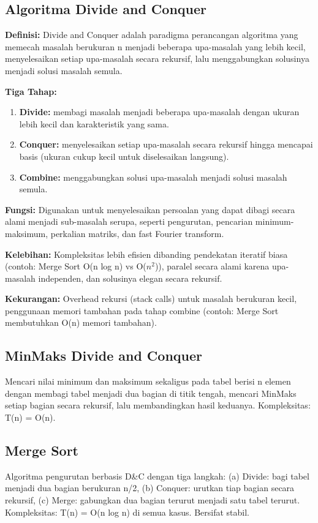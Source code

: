\subsection{Algoritma Divide and Conquer}
\textbf{Definisi:} Divide and Conquer adalah paradigma perancangan algoritma yang memecah masalah berukuran n menjadi beberapa upa-masalah yang lebih kecil, menyelesaikan setiap upa-masalah secara rekursif, lalu menggabungkan solusinya menjadi solusi masalah semula.

\textbf{Tiga Tahap:} 
\begin{enumerate}
    \item \textbf{Divide:} membagi masalah menjadi beberapa upa-masalah dengan ukuran lebih kecil dan karakteristik yang sama.
    \item \textbf{Conquer:} menyelesaikan setiap upa-masalah secara rekursif hingga mencapai basis (ukuran cukup kecil untuk diselesaikan langsung).
    \item \textbf{Combine:} menggabungkan solusi upa-masalah menjadi solusi masalah semula.
\end{enumerate}

\textbf{Fungsi:} Digunakan untuk menyelesaikan persoalan yang dapat dibagi secara alami menjadi sub-masalah serupa, seperti pengurutan, pencarian minimum-maksimum, perkalian matriks, dan fast Fourier transform.

\textbf{Kelebihan:} Kompleksitas lebih efisien dibanding pendekatan iteratif biasa (contoh: Merge Sort O(n log n) vs O($n^2$)), paralel secara alami karena upa-masalah independen, dan solusinya elegan secara rekursif.

\textbf{Kekurangan:} Overhead rekursi (stack calls) untuk masalah berukuran kecil, penggunaan memori tambahan pada tahap combine (contoh: Merge Sort membutuhkan O(n) memori tambahan).

\subsection{MinMaks Divide and Conquer}
Mencari nilai minimum dan maksimum sekaligus pada tabel berisi n elemen dengan membagi tabel menjadi dua bagian di titik tengah, mencari MinMaks setiap bagian secara rekursif, lalu membandingkan hasil keduanya. Kompleksitas: T(n) = O(n).

\subsection{Merge Sort}
Algoritma pengurutan berbasis D\&C dengan tiga langkah: (a) Divide: bagi tabel menjadi dua bagian berukuran n/2, (b) Conquer: urutkan tiap bagian secara rekursif, (c) Merge: gabungkan dua bagian terurut menjadi satu tabel terurut. Kompleksitas: T(n) = O(n log n) di semua kasus. Bersifat stabil.

